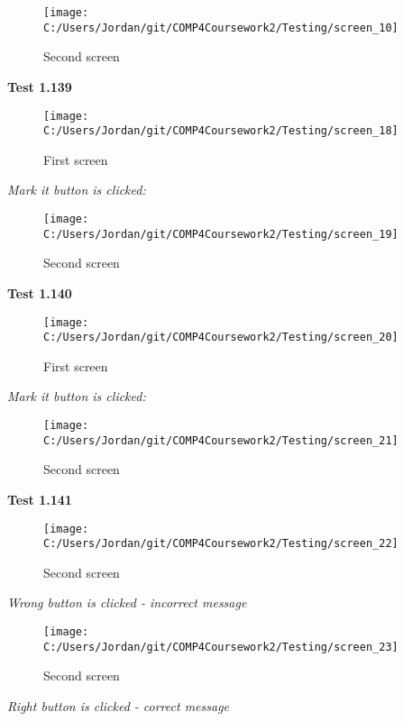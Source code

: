 \begin{figure}[H]
    \label{fig: Second Screen}\caption{Second screen}
    \texttt{[image: C:/Users/Jordan/git/COMP4Coursework2/Testing/screen\_10]}
\end{figure}

\textbf{Test 1.139}

\begin{figure}[H]
    \label{fig: First Screen}\caption{First screen}
    \texttt{[image: C:/Users/Jordan/git/COMP4Coursework2/Testing/screen\_18]}
\end{figure}

\textit{Mark it button is clicked: }

\begin{figure}[H]
    \label{fig: Second Screen}\caption{Second screen}
    \texttt{[image: C:/Users/Jordan/git/COMP4Coursework2/Testing/screen\_19]}
\end{figure}

\textbf{Test 1.140}

\begin{figure}[H]
    \label{fig: First Screen}\caption{First screen}
    \texttt{[image: C:/Users/Jordan/git/COMP4Coursework2/Testing/screen\_20]}
\end{figure}

\textit{Mark it button is clicked: }

\begin{figure}[H]
    \label{fig: Second Screen}\caption{Second screen}
    \texttt{[image: C:/Users/Jordan/git/COMP4Coursework2/Testing/screen\_21]}
\end{figure}

\textbf{Test 1.141}

\begin{figure}[H]
    \label{fig: Second Screen}\caption{Second screen}
    \texttt{[image: C:/Users/Jordan/git/COMP4Coursework2/Testing/screen\_22]}
\end{figure}

\textit{Wrong button is clicked - incorrect message}

\begin{figure}[H]
    \label{fig: Second Screen}\caption{Second screen}
    \texttt{[image: C:/Users/Jordan/git/COMP4Coursework2/Testing/screen\_23]}
\end{figure}

\textit{Right button is clicked - correct message}

